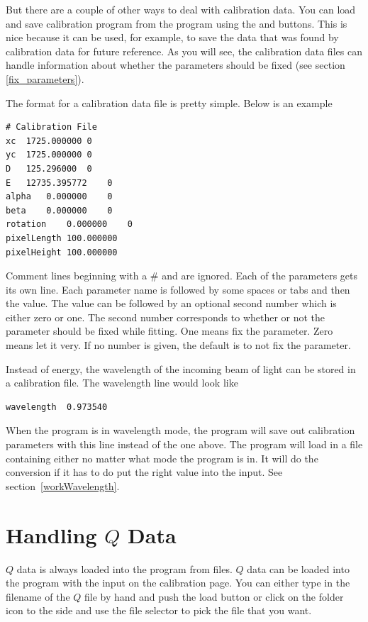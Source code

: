 But there are a couple of other ways to deal
with calibration data.
You can load and save calibration program
from the program using the 
and  buttons. This is nice
because it can be used, for example, to save 
the data that was found by calibration data
for future reference. As you will see, the 
calibration data files can handle information
about whether the parameters should be fixed
(see section \ref{fix_parameters}).

The format for a calibration data file is 
pretty simple. Below is  an example
\begin{lstlisting}[caption={Calibration Parameters}]
# Calibration File
xc	1725.000000	0
yc	1725.000000	0
D	125.296000	0
E	12735.395772	0
alpha	0.000000	0
beta	0.000000	0
rotation	0.000000	0
pixelLength	100.000000
pixelHeight	100.000000
\end{lstlisting}
Comment lines beginning with
a \# and are ignored. Each of the parameters
gets its own line. Each parameter name is 
followed by some spaces or tabs and then the
value. The value can be followed by an optional
second number which is either zero or one.
The second number corresponds to whether or
not the parameter should be fixed while
fitting. One means fix the parameter. Zero means
let it very. If no number is given, the default
is to not fix the parameter.

Instead of energy, the wavelength of the incoming
beam of light can be stored in a calibration file.
The wavelength line would look like 
\begin{lstlisting}[caption={Wavelength Parameter}]
wavelength	0.973540
\end{lstlisting}
When the program is in wavelength mode, the program
will save out calibration parameters with this line
instead of the one above. The program will load in a 
file containing either no matter what mode the program 
is in. It will do the conversion if it has to do put 
the right value into the input. See 
section~\ref{workWavelength}.


\section{\texorpdfstring{Handling $Q$ Data}{Handling Q Data}}
\label{TheQValues}

$Q$ data is always loaded into the program from files. 
$Q$ data can be loaded into the program with the 
input on the calibration page. 
You can either type in the filename of the $Q$ file by hand 
and push the load button or click on the folder icon to the 
side and use the file selector to pick the file that you want.

